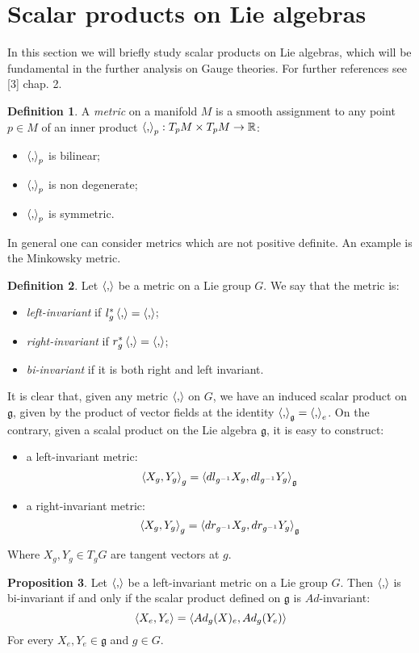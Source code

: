 \documentclass[12pt,a4paper]{report}
\theoremstyle{definition}
\newtheorem{Def}{Definition}[chapter]
\theoremstyle{Theorem}
\newtheorem{Prop}[Def]{Proposition}
\theoremstyle{definition}
\theoremstyle{definition}
\begin{document}
		\section{Scalar products on Lie algebras}
			In this section we will briefly study scalar products on Lie algebras, which will be fundamental in the further analysis on Gauge theories. For further references see [3] chap. 2.
			\begin{Def}
				A \textit{metric} on a manifold $M$ is a smooth assignment to any point $p\in M$ of an inner product $\braket{,}_p:T_pM\times T_pM\rightarrow \mathbb{R}$:
				\begin{itemize}
					\item $\braket{,}_p$ is bilinear;
					\item $\braket{,}_p$ is non degenerate;
					\item $\braket{,}_p$ is symmetric.
				\end{itemize}
			\end{Def}
			In general one can consider metrics which are not positive definite. An example is the Minkowsky metric.
			\begin{Def}
				Let $\braket{,}$ be a metric on a Lie group $G$. We say that the metric is:
				\begin{itemize}
					\item \textit{left-invariant} if $l^*_g\braket{,}=\braket{,}$;
					\item \textit{right-invariant} if $r^*_g\braket{,}=\braket{,}$;
					\item \textit{bi-invariant} if it is both right and left invariant.
				\end{itemize}
			\end{Def}
			It is clear that, given any metric $\braket{,}$ on $G$, we have an induced scalar product on $\mathfrak{g}$, given by the product of vector fields at the identity $\braket{,}_\mathfrak{g}=\braket{,}_e$. On the contrary, given a scalal product on the Lie algebra $\mathfrak{g}$, it is easy to construct:
			\begin{itemize}
				\item a left-invariant metric:
				$$\braket{X_g,Y_g}_g=\braket{dl_{g^{-1}}X_g,dl_{g^{-1}}Y_g}_\mathfrak{g}$$
				\item a right-invariant metric:
				$$\braket{X_g,Y_g}_g=\braket{dr_{g^{-1}}X_g,dr_{g^{-1}}Y_g}_\mathfrak{g}$$
			\end{itemize}
			Where $X_g,Y_g\in T_gG$ are tangent vectors at $g$.
			\begin{Prop}
				Let $\braket{,}$ be a left-invariant metric on a Lie group $G$. Then $\braket{,}$ is bi-invariant if and only if the scalar product defined on $\mathfrak{g}$ is $Ad$-invariant:
				$$\braket{X_e,Y_e}=\braket{Ad_g(X)_e,Ad_g(Y_e)}$$
				For every $X_e,Y_e\in\mathfrak{g}$ and $g\in G$.
			\end{Prop}
\end{document}
